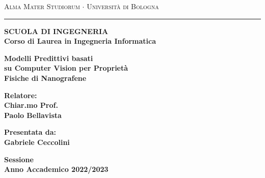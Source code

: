 \documentclass[12pt,a4paper,openright,twoside]{report}
\begin{document}
\begin{titlepage}  
\begin{center}
{{\Large{\textsc{Alma Mater Studiorum $\cdot$ Universit\`a di
Bologna}}}} 
\rule[0.1cm]{14cm}{0.1mm}
{\small{\bf SCUOLA DI INGEGNERIA\\
Corso di Laurea in Ingegneria Informatica }}
\end{center}
\vspace{15mm}
\begin{center}
{\LARGE{\bf Modelli Predittivi basati   }}\\
\vspace{3mm}
{\LARGE{\bf  su Computer Vision per Proprietà  }}\\
\vspace{3mm}
{\LARGE{\bf Fisiche di Nanografene }}\\
\end{center}
\vspace{30mm}
\par
\noindent
\begin{minipage}[t]{0.47\textwidth}
{\large{\bf Relatore:\\
Chiar.mo Prof.\\
Paolo Bellavista}}
\end{minipage}
\hfill
\begin{minipage}[t]{0.47\textwidth}\raggedleft
{\large{\bf Presentata da:\\
Gabriele Ceccolini}}
\end{minipage}
\vspace{20mm}
\begin{center}
{\large{\bf Sessione\\%
Anno Accademico 2022/2023 }}%
\end{center}
%
\thispagestyle{empty}                   %
\raggedleft                             %
\large                                  %


\end{titlepage}
\end{document}
